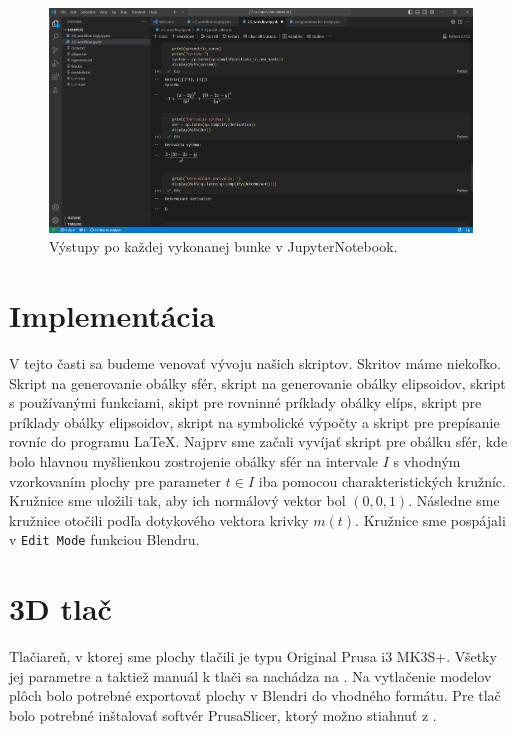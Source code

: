 \begin{figure}[h!]
	\centering
	\includegraphics[width=\textwidth]{images/jupyter.png}
	\caption[Jupyter Notebook.]{Výstupy po každej vykonanej bunke v JupyterNotebook.}
	\label{fig:jupyter}
\end{figure}

\section{Implementácia}
V tejto časti sa budeme venovať vývoju našich skriptov. Skritov máme niekoľko. Skript na generovanie obálky sfér, skript na generovanie obálky elipsoidov, skript s používanými funkciami, skipt pre rovninné príklady obálky elíps, skript pre príklady obálky elipsoidov, skript na symbolické výpočty a skript pre prepísanie rovníc do programu \LaTeX. Najprv sme začali vyvíjať skript pre obálku sfér, kde bolo hlavnou myšlienkou zostrojenie obálky sfér na intervale $I$ s vhodným vzorkovaním plochy pre parameter $t \in I$ iba pomocou charakteristických kružníc. Kružnice sme uložili tak, aby ich normálový vektor bol $(0,0,1)$. Následne sme kružnice otočili podľa dotykového vektora krivky $m(t).$ Kružnice sme pospájali v \verb|Edit Mode| funkciou Blendru.  

\section{3D tlač}
Tlačiareň, v ktorej sme plochy tlačili je typu Original Prusa i3 MK3S+. Všetky jej parametre a taktiež manuál k tlači sa nachádza na \cite{PrusaManual}. Na vytlačenie modelov plôch bolo potrebné exportovať plochy v Blendri do vhodného formátu. Pre tlač bolo potrebné inštalovať softvér PrusaSlicer, ktorý možno stiahnuť z \cite{PrusaSlicer}.
